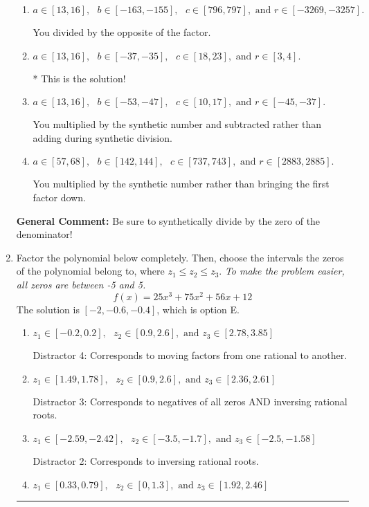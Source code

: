 \documentclass{extbook}[14pt]
\newcommand{\litem}[1]{\item #1

\rule{\textwidth}{0.4pt}}
\begin{document}
\begin{enumerate}
{\begin{enumerate}[label=\Alph*.]
 You divided by the opposite of the factor AND multiplied the first factor rather than just bringing it down.
\item \( a \in [13, 16], \text{   } b \in [-163, -155], \text{   } c \in [796, 797], \text{   and   } r \in [-3269, -3257]. \)

 You divided by the opposite of the factor.
\item \( a \in [13, 16], \text{   } b \in [-37, -35], \text{   } c \in [18, 23], \text{   and   } r \in [3, 4]. \)

* This is the solution!
\item \( a \in [13, 16], \text{   } b \in [-53, -47], \text{   } c \in [10, 17], \text{   and   } r \in [-45, -37]. \)

 You multiplied by the synthetic number and subtracted rather than adding during synthetic division.
\item \( a \in [57, 68], \text{   } b \in [142, 144], \text{   } c \in [737, 743], \text{   and   } r \in [2883, 2885]. \)

 You multiplied by the synthetic number rather than bringing the first factor down.
\end{enumerate}

\textbf{General Comment:} Be sure to synthetically divide by the zero of the denominator!
}
\litem{
Factor the polynomial below completely. Then, choose the intervals the zeros of the polynomial belong to, where $z_1 \leq z_2 \leq z_3$. \textit{To make the problem easier, all zeros are between -5 and 5.}
\[ f(x) = 25x^{3} +75 x^{2} +56 x + 12 \]The solution is \( [-2, -0.6, -0.4] \), which is option E.\begin{enumerate}[label=\Alph*.]
\item \( z_1 \in [-0.2, 0.2], \text{   }  z_2 \in [0.9, 2.6], \text{   and   } z_3 \in [2.78, 3.85] \)

 Distractor 4: Corresponds to moving factors from one rational to another.
\item \( z_1 \in [1.49, 1.78], \text{   }  z_2 \in [0.9, 2.6], \text{   and   } z_3 \in [2.36, 2.61] \)

 Distractor 3: Corresponds to negatives of all zeros AND inversing rational roots.
\item \( z_1 \in [-2.59, -2.42], \text{   }  z_2 \in [-3.5, -1.7], \text{   and   } z_3 \in [-2.5, -1.58] \)

 Distractor 2: Corresponds to inversing rational roots.
\item \( z_1 \in [0.33, 0.79], \text{   }  z_2 \in [0, 1.3], \text{   and   } z_3 \in [1.92, 2.46] \)


\end{enumerate}}
\end{enumerate}
\end{document}

